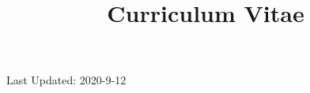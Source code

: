 \documentclass[12pt, letterpaper, sans, unicode]{moderncv}
\title{Curriculum Vitae}
\begin{document}
    \makecvtitle


    

    

    
    
    

    

    
    
    
    
    
    
    
    
    

    

    \vspace{50pt}
    Last Updated: 2020-9-12
\end{document}
